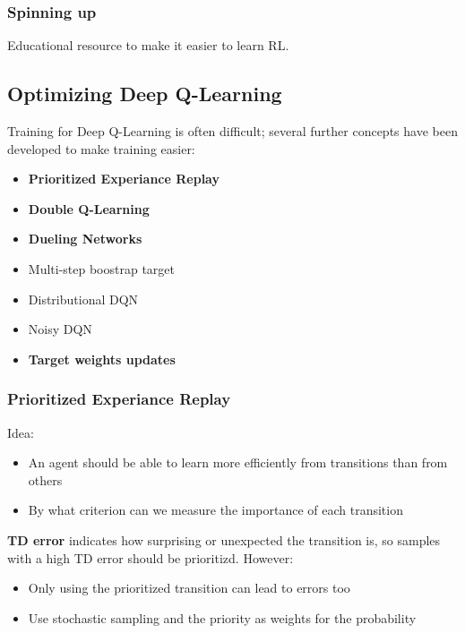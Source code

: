 \subsubsection*{Spinning up}
Educational resource to make it easier to learn RL.

\subsection{Optimizing Deep Q-Learning}
Training for Deep Q-Learning is often difficult; several further concepts have been developed to make training easier:
\begin{itemize}
    \item \textbf{Prioritized Experiance Replay}
    \item \textbf{Double Q-Learning}
    \item \textbf{Dueling Networks}
    \item Multi-step boostrap target
    \item Distributional DQN
    \item Noisy DQN
    \item \textbf{Target weights updates}
\end{itemize}

\subsubsection{Prioritized Experiance Replay}
Idea:
\begin{itemize}
    \item An agent should be able to learn more efficiently from transitions than from others
    \item By what criterion can we measure the importance of each transition
\end{itemize}
\textbf{TD error} indicates how surprising or unexpected the transition is, so samples with a high TD error should be prioritizd.
However:
\begin{itemize}
    \item Only using the prioritized transition can lead to errors too 
    \item Use stochastic sampling and the priority as weights for the probability
\end{itemize}
